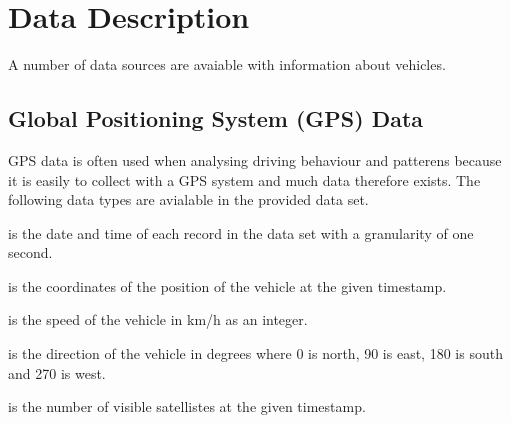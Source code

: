 \section{Data Description}
A number of data sources are avaiable with information about vehicles.

\subsection{Global Positioning System (GPS) Data}
GPS data is often used when analysing driving behaviour and patterens because it is easily to collect with a GPS system and much data therefore exists. 
The following data types are avialable in the provided data set.
\vspace{-5mm}
\begin{description*}
\item{} is the date and time of each record in the data set with a granularity of one second. 
\item{} is the coordinates of the position of the vehicle at the given timestamp.
\item{} is the speed of the vehicle in km/h as an integer.
\item{} is the direction of the vehicle in degrees where 0 is north, 90 is east, 180 is south and 270 is west.
\item{} is the number of visible satellistes at the given timestamp.
\end{description*}

